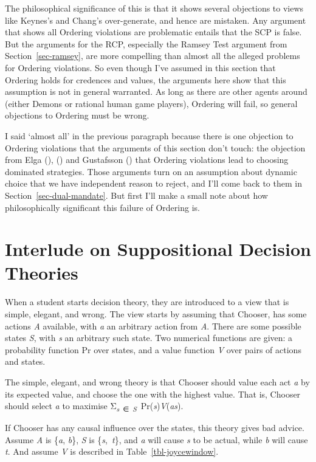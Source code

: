 \documentclass[
  11pt,
  letterpaper,
  DIV=11,
  numbers=noendperiod,
  twoside]{scrartcl}
\begin{document}
The philosophical significance of this is that it shows several
objections to views like Keynes's and Chang's over-generate, and hence
are mistaken. Any argument that shows all Ordering violations are
problematic entails that the SCP is false. But the arguments for the
RCP, especially the Ramsey Test argument from Section~\ref{sec-ramsey},
are more compelling than almost all the alleged problems for Ordering
violations. So even though I've assumed in this section that Ordering
holds for credences and values, the arguments here show that this
assumption is not in general warranted. As long as there are other
agents around (either Demons or rational human game players), Ordering
will fail, so general objections to Ordering must be wrong.

I said `almost all' in the previous paragraph because there is one
objection to Ordering violations that the arguments of this section
don't touch: the objection from Elga (),
() and Gustafsson
() that Ordering violations lead to
choosing dominated strategies. Those arguments turn on an assumption
about dynamic choice that we have independent reason to reject, and I'll
come back to them in Section~\ref{sec-dual-mandate}. But first I'll make
a small note about how philosophically significant this failure of
Ordering is.

\section{Interlude on Suppositional Decision
Theories}\label{sec-suppositional}

When a student starts decision theory, they are introduced to a view
that is simple, elegant, and wrong. The view starts by assuming that
Chooser, has some actions \emph{A} available, with \emph{a} an arbitrary
action from \emph{A}. There are some possible states \emph{S}, with
\emph{s} an arbitrary such state. Two numerical functions are given: a
probability function Pr over states, and a value function \emph{V} over
pairs of actions and states.

The simple, elegant, and wrong theory is that Chooser should value each
act \emph{a} by its expected value, and choose the one with the highest
value. That is, Chooser should select \emph{a} to maximise
Σ\textsubscript{\emph{s}~∈~\emph{S}}~Pr(\emph{s})\emph{V}(\emph{as}).

If Chooser has any causal influence over the states, this theory gives
bad advice. Assume \emph{A} is \{\emph{a}, \emph{b}\}, \emph{S} is
\{\emph{s},~\emph{t}\}, and \emph{a} will cause \emph{s} to be actual,
while \emph{b} will cause \emph{t}. And assume \emph{V} is described in
Table~\ref{tbl-joycewindow}.
\end{document}
